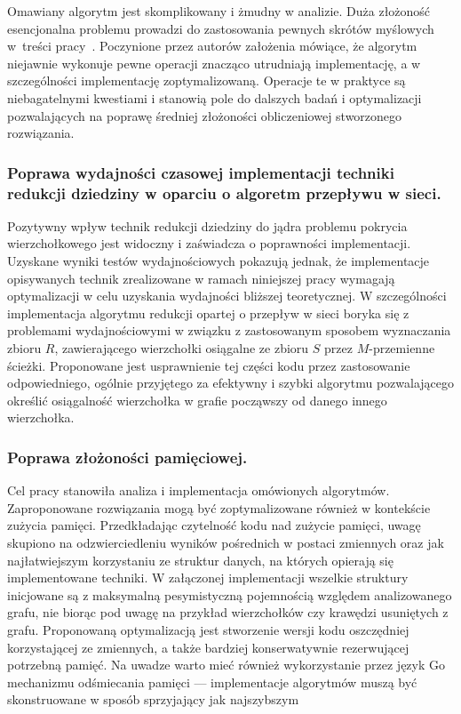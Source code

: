   Omawiany algorytm jest skomplikowany i żmudny w analizie.
  Duża złożoność esencjonalna problemu prowadzi do zastosowania pewnych skrótów myślowych w~treści pracy~\cite{ImprovedBounds10}.
  Poczynione przez autorów założenia mówiące, że algorytm niejawnie wykonuje pewne operacji znacząco utrudniają implementację, a w szczególności implementację zoptymalizowaną.
  Operacje te w praktyce są niebagatelnymi kwestiami i stanowią pole do dalszych badań i optymalizacji pozwalających na poprawę średniej złożoności obliczeniowej stworzonego rozwiązania.

  \subsubsection{\textbf{Poprawa wydajności czasowej implementacji techniki redukcji dziedziny w oparciu o algoretm przepływu w sieci.}}

  Pozytywny wpływ technik redukcji dziedziny do jądra problemu pokrycia wierzchołkowego jest widoczny i zaświadcza o poprawności implementacji.
  Uzyskane wyniki testów wydajnościowych pokazują jednak, że implementacje opisywanych technik zrealizowane w ramach niniejszej pracy wymagają optymalizacji w celu uzyskania wydajności bliższej teoretycznej.
  W szczególności implementacja algorytmu redukcji opartej o przepływ w sieci boryka się z problemami wydajnościowymi w związku z zastosowanym sposobem wyznaczania zbioru $R$, zawierającego wierzchołki osiągalne ze zbioru $S$ przez $M$-przemienne ścieżki.
  Proponowane jest usprawnienie tej części kodu przez zastosowanie odpowiedniego, ogólnie przyjętego za efektywny i szybki algorytmu pozwalającego określić osiągalność wierzchołka w grafie począwszy od danego innego wierzchołka.

  \subsubsection{\textbf{Poprawa złożoności pamięciowej.}}

  Cel pracy stanowiła analiza i implementacja omówionych algorytmów.
  Zaproponowane rozwiązania mogą być zoptymalizowane również w kontekście zużycia pamięci.
  Przedkładając czytelność kodu nad zużycie pamięci, uwagę skupiono na odzwierciedleniu wyników pośrednich w postaci zmiennych oraz jak najłatwiejszym korzystaniu ze struktur danych, na których opierają się implementowane techniki.
  W załączonej implementacji wszelkie struktury inicjowane są z maksymalną pesymistyczną pojemnością względem analizowanego grafu, nie biorąc pod uwagę na przykład wierzchołków czy krawędzi usuniętych z grafu.
  Proponowaną optymalizacją jest stworzenie wersji kodu oszczędniej korzystającej ze zmiennych, a także bardziej konserwatywnie rezerwującej potrzebną pamięć.
  Na uwadze warto mieć również wykorzystanie przez język Go mechanizmu odśmiecania pamięci --- implementacje algorytmów muszą być skonstruowane w sposób sprzyjający jak najszybszym 

